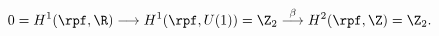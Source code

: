 \begin{equation}
0=H^1(\rpf,\R)\longrightarrow H^1(\rpf,U(1))=\Z_2\stackrel{\beta}{\longrightarrow} H^2(\rpf,\Z)=\Z_2.
\end{equation}

